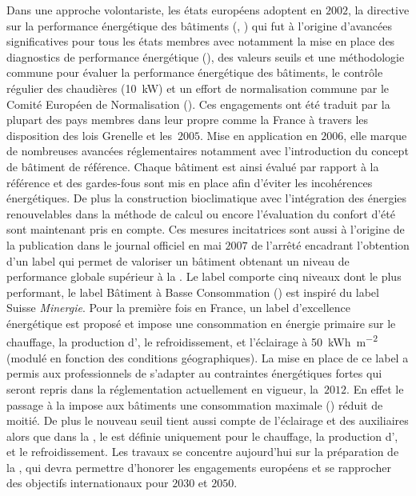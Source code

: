 Dans une approche volontariste, les états européens adoptent en $2002$, la directive sur la
performance énergétique des bâtiments (, \cite{EPBD2002}) qui fut à
l’origine d’avancées significatives pour tous les états membres avec notamment la mise en
place des diagnostics de performance énergétique (), des valeurs seuils et une
méthodologie commune pour évaluer la performance énergétique des bâtiments, le contrôle
régulier des chaudières (\SI{+10}{kW}) et un effort de normalisation commune par le Comité
Européen de Normalisation ().
Ces engagements ont été traduit par la plupart des pays membres dans leur 
propre comme la France à travers les
disposition des lois Grenelle et les \,$2005$.
Mise en application en $2006$, elle marque de nombreuses avancées
réglementaires notamment avec l’introduction du concept de bâtiment de référence. Chaque
bâtiment est ainsi évalué par rapport à la référence et des gardes-fous sont mis en place
afin d’éviter les incohérences énergétiques. De plus la construction bioclimatique avec
l’intégration des énergies renouvelables dans la méthode de calcul ou encore l’évaluation
du confort d’été sont maintenant pris en compte.
Ces mesures incitatrices sont aussi à l’origine de la publication dans le journal officiel
en mai $2007$ de l’arrêté encadrant l’obtention d’un label  qui permet de valoriser
un bâtiment obtenant un niveau de performance globale supérieur à la .
Le label comporte cinq niveaux dont le plus performant, le label Bâtiment à
Basse Consommation ()
est inspiré du label Suisse \textit{Minergie}. Pour la première fois en France, un
label d’excellence énergétique est proposé et impose une consommation en énergie primaire
sur le chauffage, la production d’, le refroidissement, et l’éclairage à
\SI{50}{kWh\per\metre\squared} (modulé en fonction des conditions géographiques).
La mise en place de ce label a permis aux professionnels de s’adapter au contraintes
énergétiques fortes qui seront repris dans la réglementation actuellement en vigueur, la
\,$2012$.
En effet le passage à la  impose aux bâtiments une consommation maximale ()
réduit de moitié. De plus le nouveau seuil tient aussi compte de l’éclairage et des auxiliaires alors
que dans la , le  est définie uniquement pour le
chauffage, la production d’, et le refroidissement. Les travaux se concentre
aujourd’hui sur la préparation de la , qui devra permettre d’honorer les
engagements européens et se rapprocher des objectifs internationaux pour $2030$ et $2050$.

